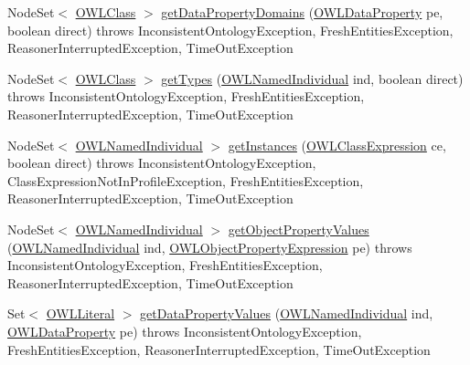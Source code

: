 \begin{DoxyCompactItemize}
\item 
Node\-Set$<$ \hyperlink{interfaceorg_1_1semanticweb_1_1owlapi_1_1model_1_1_o_w_l_class}{O\-W\-L\-Class} $>$ \hyperlink{classorg_1_1semanticweb_1_1owlapi_1_1reasoner_1_1structural_1_1_structural_reasoner_a1c3125ae628a20d9402ff74c39a4db49}{get\-Data\-Property\-Domains} (\hyperlink{interfaceorg_1_1semanticweb_1_1owlapi_1_1model_1_1_o_w_l_data_property}{O\-W\-L\-Data\-Property} pe, boolean direct)  throws Inconsistent\-Ontology\-Exception, Fresh\-Entities\-Exception, Reasoner\-Interrupted\-Exception, Time\-Out\-Exception 
\item 
Node\-Set$<$ \hyperlink{interfaceorg_1_1semanticweb_1_1owlapi_1_1model_1_1_o_w_l_class}{O\-W\-L\-Class} $>$ \hyperlink{classorg_1_1semanticweb_1_1owlapi_1_1reasoner_1_1structural_1_1_structural_reasoner_a3c39a4e440f49944ec7d76c927f32a35}{get\-Types} (\hyperlink{interfaceorg_1_1semanticweb_1_1owlapi_1_1model_1_1_o_w_l_named_individual}{O\-W\-L\-Named\-Individual} ind, boolean direct)  throws Inconsistent\-Ontology\-Exception, Fresh\-Entities\-Exception, Reasoner\-Interrupted\-Exception, Time\-Out\-Exception 
\item 
Node\-Set$<$ \hyperlink{interfaceorg_1_1semanticweb_1_1owlapi_1_1model_1_1_o_w_l_named_individual}{O\-W\-L\-Named\-Individual} $>$ \hyperlink{classorg_1_1semanticweb_1_1owlapi_1_1reasoner_1_1structural_1_1_structural_reasoner_a32479d4be4145033090caa2209170b53}{get\-Instances} (\hyperlink{interfaceorg_1_1semanticweb_1_1owlapi_1_1model_1_1_o_w_l_class_expression}{O\-W\-L\-Class\-Expression} ce, boolean direct)  throws Inconsistent\-Ontology\-Exception, Class\-Expression\-Not\-In\-Profile\-Exception, Fresh\-Entities\-Exception, Reasoner\-Interrupted\-Exception, Time\-Out\-Exception 
\item 
Node\-Set$<$ \hyperlink{interfaceorg_1_1semanticweb_1_1owlapi_1_1model_1_1_o_w_l_named_individual}{O\-W\-L\-Named\-Individual} $>$ \hyperlink{classorg_1_1semanticweb_1_1owlapi_1_1reasoner_1_1structural_1_1_structural_reasoner_a0fcc28c79dc2b7588f4b1c744a6588be}{get\-Object\-Property\-Values} (\hyperlink{interfaceorg_1_1semanticweb_1_1owlapi_1_1model_1_1_o_w_l_named_individual}{O\-W\-L\-Named\-Individual} ind, \hyperlink{interfaceorg_1_1semanticweb_1_1owlapi_1_1model_1_1_o_w_l_object_property_expression}{O\-W\-L\-Object\-Property\-Expression} pe)  throws Inconsistent\-Ontology\-Exception, Fresh\-Entities\-Exception, Reasoner\-Interrupted\-Exception, Time\-Out\-Exception 
\item 
Set$<$ \hyperlink{interfaceorg_1_1semanticweb_1_1owlapi_1_1model_1_1_o_w_l_literal}{O\-W\-L\-Literal} $>$ \hyperlink{classorg_1_1semanticweb_1_1owlapi_1_1reasoner_1_1structural_1_1_structural_reasoner_a6d4be33b72e5d624d8a930b456d6d31f}{get\-Data\-Property\-Values} (\hyperlink{interfaceorg_1_1semanticweb_1_1owlapi_1_1model_1_1_o_w_l_named_individual}{O\-W\-L\-Named\-Individual} ind, \hyperlink{interfaceorg_1_1semanticweb_1_1owlapi_1_1model_1_1_o_w_l_data_property}{O\-W\-L\-Data\-Property} pe)  throws Inconsistent\-Ontology\-Exception, Fresh\-Entities\-Exception, Reasoner\-Interrupted\-Exception, Time\-Out\-Exception 

\end{DoxyCompactItemize}
